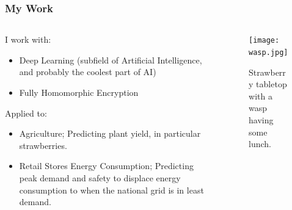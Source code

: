 \documentclass[aspectratio=169]{beamer}
\begin{document}
  \begin{frame}
    \frametitle{My Work}
    \begin{columns}
      \begin{column}{0.5\textwidth}
        I work with:
        \begin{itemize}
          \item Deep Learning (subfield of Artificial Intelligence, and probably the coolest part of AI)
          \item Fully Homomorphic Encryption
        \end{itemize}
        Applied to:
        \begin{itemize}
          \item Agriculture; Predicting plant yield, in particular strawberries.
          \item Retail Stores Energy Consumption; Predicting peak demand and safety to displace energy consumption to when the national grid is in least demand.
        \end{itemize}
      \end{column}
      \begin{column}{0.5\textwidth}
        \begin{figure}[th!]
          \centering
          \texttt{[image: wasp.jpg]}
          \caption{Strawberry tabletop with a wasp having some lunch.}
          \label{fig:wasp}
        \end{figure}
      \end{column}

    \end{columns}
  \end{frame}
\end{document}

